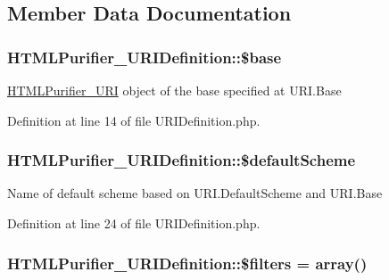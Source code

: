 \subsection{Member Data Documentation}
\hypertarget{classHTMLPurifier__URIDefinition_acbd574495184a66e4d2095ec70815c59}{
\subsubsection[{\$base}]{\setlength{\rightskip}{0pt plus 5cm}H\+T\+M\+L\+Purifier\+\_\+\+U\+R\+I\+Definition\+::\$base}}\label{classHTMLPurifier__URIDefinition_acbd574495184a66e4d2095ec70815c59}
\hyperlink{classHTMLPurifier__URI}{H\+T\+M\+L\+Purifier\+\_\+\+U\+R\+I} object of the base specified at U\+R\+I.\+Base 

Definition at line 14 of file U\+R\+I\+Definition.\+php.

\hypertarget{classHTMLPurifier__URIDefinition_afb85743941b395f885ecde8165c19b9d}{
\subsubsection[{\$default\+Scheme}]{\setlength{\rightskip}{0pt plus 5cm}H\+T\+M\+L\+Purifier\+\_\+\+U\+R\+I\+Definition\+::\$default\+Scheme}}\label{classHTMLPurifier__URIDefinition_afb85743941b395f885ecde8165c19b9d}
Name of default scheme based on U\+R\+I.\+Default\+Scheme and U\+R\+I.\+Base 

Definition at line 24 of file U\+R\+I\+Definition.\+php.

\hypertarget{classHTMLPurifier__URIDefinition_aa2e2666cb45427509548175fb171c950}{
\subsubsection[{\$filters}]{\setlength{\rightskip}{0pt plus 5cm}H\+T\+M\+L\+Purifier\+\_\+\+U\+R\+I\+Definition\+::\$filters = array()\hspace{0.3cm}{\ttfamily [protected]}}}\label{classHTMLPurifier__URIDefinition_aa2e2666cb45427509548175fb171c950}


